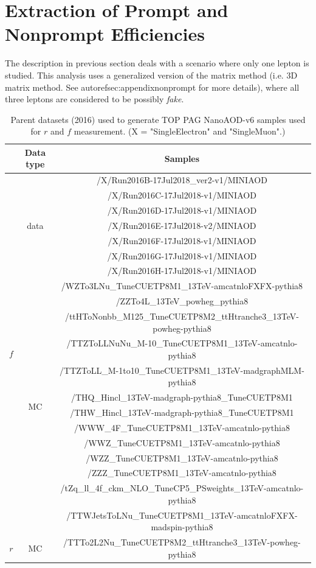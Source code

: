 \section{Extraction of Prompt and Nonprompt Efficiencies}
\label{sec:MR}

The description in previous section deals with a scenario where only one lepton is studied. This analysis uses a generalized version of the matrix method (i.e. 3D matrix method. See autoref{sec:appendixnonprompt} for more details), where all three leptons are considered to be possibly \emph{fake}.

\begin{table}[htbp]
 \begin{center}
 \caption{Parent datasets (2016) used to generate TOP PAG NanoAOD-v6 samples used for $r$ and $f$ measurement. (\small{X = "SingleElectron" and "SingleMuon".)
 }}
 \label{tab:2016_RandF_Samples}
 \begin{tabular}{c|c|c}
  \hline
  & Data type & Samples  \\  
  \hline\hline
  \multirow{20}{*}{$f$} & \multirow{7}{*}{data} &
  /X/Run2016B-17Jul2018\_ver2-v1/MINIAOD \\
  & & /X/Run2016C-17Jul2018-v1/MINIAOD \\
  & & /X/Run2016D-17Jul2018-v1/MINIAOD \\
  & & /X/Run2016E-17Jul2018-v2/MINIAOD \\
  & & /X/Run2016F-17Jul2018-v1/MINIAOD \\
  & & /X/Run2016G-17Jul2018-v1/MINIAOD \\
  & & /X/Run2016H-17Jul2018-v1/MINIAOD \\ \cline{2-3}
  & \multirow{13}{*}{MC} &
  /WZTo3LNu\_TuneCUETP8M1\_13TeV-amcatnloFXFX-pythia8 \\
  & & /ZZTo4L\_13TeV\_powheg\_pythia8 \\
  & & /ttHToNonbb\_M125\_TuneCUETP8M2\_ttHtranche3\_13TeV-powheg-pythia8\\
  & & /TTZToLLNuNu\_M-10\_TuneCUETP8M1\_13TeV-amcatnlo-pythia8 \\
  & & /TTZToLL\_M-1to10\_TuneCUETP8M1\_13TeV-madgraphMLM-pythia8\\
  & & /THQ\_Hincl\_13TeV-madgraph-pythia8\_TuneCUETP8M1   \\
  & & /THW\_Hincl\_13TeV-madgraph-pythia8\_TuneCUETP8M1  \\
  & &/WWW\_4F\_TuneCUETP8M1\_13TeV-amcatnlo-pythia8  \\
  & &/WWZ\_TuneCUETP8M1\_13TeV-amcatnlo-pythia8 \\
  & &/WZZ\_TuneCUETP8M1\_13TeV-amcatnlo-pythia8  \\
  & &/ZZZ\_TuneCUETP8M1\_13TeV-amcatnlo-pythia8  \\
  & & /tZq\_ll\_4f\_ckm\_NLO\_TuneCP5\_PSweights\_13TeV-amcatnlo-pythia8 \\
  & & /TTWJetsToLNu\_TuneCUETP8M1\_13TeV-amcatnloFXFX-madspin-pythia8 \\ \hline
  $r$ & MC & /TTTo2L2Nu\_TuneCUETP8M2\_ttHtranche3\_13TeV-powheg-pythia8 \\ \hline
 \end{tabular}
 \end{center}
\end{table}

